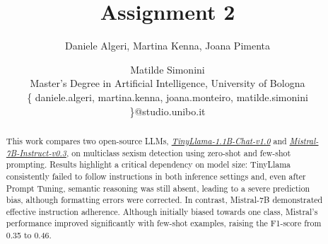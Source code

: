 \documentclass[11pt]{article}
\begin{document}
%
\title{Assignment 2\\
\large {}
}
\author{Daniele Algeri,
Martina Kenna,
Joana Pimenta
\and
Matilde Simonini\\
Master's Degree in Artificial Intelligence, University of Bologna\\
\{ daniele.algeri, martina.kenna, joana.monteiro, matilde.simonini \}@studio.unibo.it
}
\maketitle



\begin{abstract}



This work compares two open-source LLMs, \href{https://huggingface.co/TinyLlama/TinyLlama-1.1B-Chat-v1.0}{\textit{TinyLlama-1.1B-Chat-v1.0}}  and \href{https://huggingface.co/mistralai/Mistral-7B-v0.3}{\textit{Mistral-7B-Instruct-v0.3}}, on multiclass sexism detection using zero-shot and few-shot prompting. Results highlight a critical dependency on model size: TinyLlama consistently failed to follow instructions in both inference settings and, even after Prompt Tuning, semantic reasoning was still absent, leading to a severe prediction bias, although formatting errors were corrected. In contrast, Mistral-7B demonstrated effective instruction adherence. Although initially biased towards one class, Mistral's performance improved significantly with few-shot examples, raising the F1-score from 0.35 to 0.46.
\end{abstract}
\end{document}
